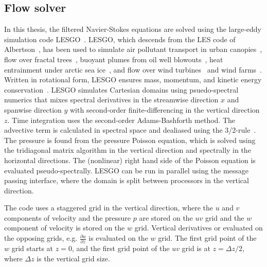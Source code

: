 \subsection{Flow solver}
\label{subsec:methods-les-solver}
In this thesis, the filtered Navier-Stokes equations are solved using the large-eddy simulation code LESGO~\cite{LESGO}. LESGO, which descends from the LES code of Albertson~\cite{Albertson1999a}, has been used to simulate air pollutant transport in urban canopies~\cite{Tseng2006a}, flow over fractal trees~\cite{Graham2012a}, buoyant plumes from oil well blowouts~\cite{Yang2016a}, heat entrainment under arctic sea ice~\cite{Ramudu2017a}, and flow over wind turbines~\cite{Martinez2018a} and wind farms~\cite{Calaf2010a, Stevens2014b, Verhulst2015a, Stevens2018a}. Written in rotational form, LESGO ensures mass, momentum, and kinetic energy conservation~\cite{Albertson1999a}. LESGO simulates Cartesian domains using psuedo-spectral numerics that mixes spectral derivatives in the streamwise direction $x$ and spanwise direction $y$ with second-order finite-differencing in the vertical direction $z$. Time integration uses the second-order Adams-Bashforth method. The advective term is calculated in spectral space and dealiased using the 3/2-rule~\cite{Orszag1975a}. The pressure is found from the pressure Poisson equation, which is solved using the tridiagonal matrix algorithm in the vertical direction and spectrally in the horizontal directions. The (nonlinear) right hand side of the Poisson equation is evaluated pseudo-spectrally. LESGO can be run in parallel using the message passing interface, where the domain is split between processors in the vertical direction.

The code uses a staggered grid in the vertical direction, where the $u$ and $v$ components of velocity and the pressure $p$ are stored on the $uv$ grid and the $w$ component of velocity is stored on the $w$ grid. Vertical derivatives or evaluated on the opposing grids, e.g. $\frac{\partial u}{\partial z}$ is evaluated on the $w$ grid. The first grid point of the $w$ grid starts at $z=0$, and the first grid point of the $uv$ grid is at $z=\Delta z/2$, where $\Delta z$ is the vertical grid size.

